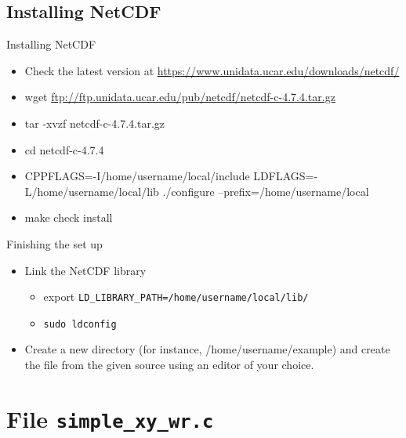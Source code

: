 \documentclass[compress,11pt,xcolor=svgnames,aspectratio=169]{beamer}
\begin{document}
\subsection{Installing NetCDF}

\begin{frame}[fragile]{Installing NetCDF}

\begin{itemize}

  \item Check the latest version at \url{https://www.unidata.ucar.edu/downloads/netcdf/}
  \item wget \url{ftp://ftp.unidata.ucar.edu/pub/netcdf/netcdf-c-4.7.4.tar.gz}
  \item tar -xvzf netcdf-c-4.7.4.tar.gz
  \item cd netcdf-c-4.7.4
  \item CPPFLAGS=-I/home/username/local/include LDFLAGS=-L/home/username/local/lib ./configure --prefix=/home/username/local
  \item make check install

\end{itemize}

\end{frame}

\begin{frame}[fragile]{Finishing the set up}

\begin{itemize}

  \item Link the NetCDF library\\[0.3cm]
  \begin{itemize}
    \item export \verb|LD_LIBRARY_PATH=/home/username/local/lib/|\\[0.3cm]
    \item \verb|sudo ldconfig|\\[0.4cm]
  \end{itemize}
  \item Create a new directory (for instance, /home/username/example) and create the file from the given source using an editor of your choice.

\end{itemize}

\end{frame}

\section{File \texttt{simple\_xy\_wr.c}}
\end{document}

